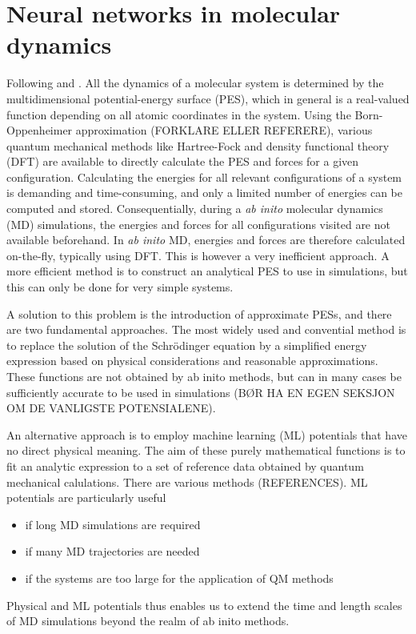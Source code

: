 \documentclass[twoside,english]{uiofysmaster}
\begin{document}
\chapter{Neural networks in molecular dynamics}
Following \cite{Behler15} and \cite{Behler11symmetry}.
All the dynamics of a molecular system is determined by the multidimensional potential-energy surface (PES), which
in general is a real-valued function depending on all atomic coordinates in the system. Using the Born-Oppenheimer approximation
(FORKLARE ELLER REFERERE), 
various quantum mechanical methods like Hartree-Fock and density functional theory (DFT) are available to directly calculate
the PES and forces for a given configuration. Calculating the energies for all relevant configurations of a system is
demanding and time-consuming, and only a limited number of energies can be computed and stored. 
Consequentially, during a \textit{ab inito} molecular dynamics (MD) simulations, the energies and forces for all configurations visited
are not available beforehand. In \textit{ab inito} MD, energies and forces are therefore calculated on-the-fly, typically using DFT.
This is however a very inefficient approach. A more efficient method is to construct an analytical PES to use in simulations, 
but this can only be done for very simple systems.

A solution to this problem is the introduction of approximate PESs, and there are two fundamental approaches. 
The most widely used and convential method is to replace the solution of the Schrödinger equation by a simplified
energy expression based on physical considerations and reasonable approximations. These functions are not obtained
by ab inito methods, but can in many cases be sufficiently accurate to be used in simulations (BØR HA EN EGEN SEKSJON
OM DE VANLIGSTE POTENSIALENE).

An alternative approach is to employ machine learning (ML) potentials that have no direct physical meaning. 
The aim of these purely mathematical functions is to fit an analytic expression to a set of reference data
obtained by quantum mechanical calulations. There are various methods (REFERENCES). 
ML potentials are particularly useful
\begin{itemize}
 \item if long MD simulations are required
 \item if many MD trajectories are needed
 \item if the systems are too large for the application of QM methods
\end{itemize}
Physical and ML potentials thus enables us to extend the time and length scales of MD simulations
beyond the realm of ab inito methods. 
\end{document}

